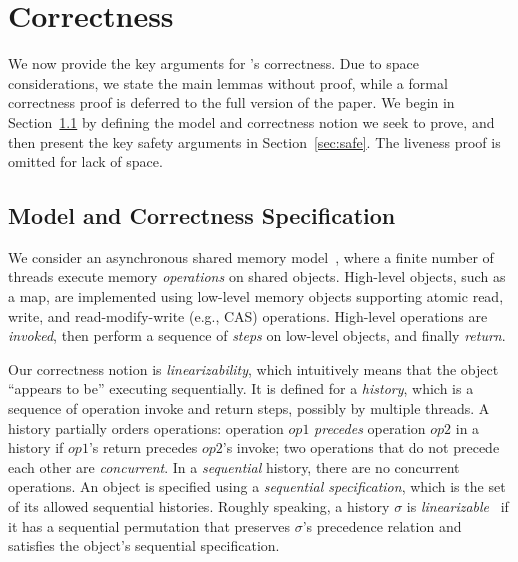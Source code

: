 \newcommand{\lp}[1]{LP(\ensuremath{#1})}

\section{Correctness}
\label{sec:proof}

We now provide the key arguments for \kiwi's correctness. 
Due to space considerations, we state the main lemmas without proof, while 
a formal correctness proof is deferred to the full version of the paper.
We begin in Section~\ref{sec:spec} by defining the model and correctness notion we seek to prove, and then present  
the key safety arguments in Section~\ref{sec:safe}. The liveness proof is omitted for lack of space. 

\subsection{Model and Correctness Specification}
\label{sec:spec}

We consider an asynchronous shared memory model~\cite{Welch2004}, where a finite number of threads execute memory \emph{operations} on shared objects. High-level objects, such as a map, are implemented using low-level memory objects supporting atomic read, write, and read-modify-write (e.g., CAS) operations. 
High-level operations are \emph{invoked}, then perform a sequence of  \emph{steps} on low-level objects, and finally \emph{return}.

Our correctness notion is \emph{linearizability}, which intuitively means that the object ``appears to be'' executing sequentially. 
It is defined for a \emph{history}, which is a sequence of operation invoke and return steps, possibly by multiple threads.
A history partially orders operations: 
operation $op1$ \emph{precedes} operation $op2$ in a history if $op1$'s return precedes $op2$'s invoke;
two operations that do not precede each other are \emph{concurrent}. In a  \emph{sequential} history, there are no concurrent operations.
An object is specified using a \emph{sequential specification}, which is the set of its allowed sequential histories. 
Roughly speaking, a history $\sigma$ is \emph{linearizable}~\cite{HerlihyW1990} if it has a sequential permutation that preserves 
$\sigma$'s precedence relation and satisfies the object's sequential specification. 

